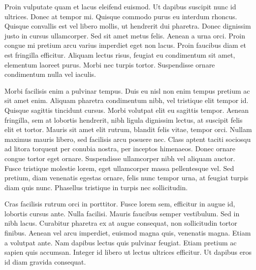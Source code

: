 Proin vulputate quam et lacus eleifend euismod. Ut dapibus suscipit nunc id ultrices. Donec at tempor mi. Quisque commodo purus eu interdum rhoncus. Quisque convallis est vel libero mollis, ut hendrerit dui pharetra. Donec dignissim justo in cursus ullamcorper. Sed sit amet metus felis. Aenean a urna orci. Proin congue mi pretium arcu varius imperdiet eget non lacus. Proin faucibus diam et est fringilla efficitur. Aliquam lectus risus, feugiat eu condimentum sit amet, elementum laoreet purus. Morbi nec turpis tortor. Suspendisse ornare condimentum nulla vel iaculis.

Morbi facilisis enim a pulvinar tempus. Duis eu nisl non enim tempus pretium ac sit amet enim. Aliquam pharetra condimentum nibh, vel tristique elit tempor id. Quisque sagittis tincidunt cursus. Morbi volutpat elit eu sagittis tempor. Aenean fringilla, sem at lobortis hendrerit, nibh ligula dignissim lectus, at suscipit felis elit et tortor. Mauris sit amet elit rutrum, blandit felis vitae, tempor orci. Nullam maximus mauris libero, sed facilisis arcu posuere nec. Class aptent taciti sociosqu ad litora torquent per conubia nostra, per inceptos himenaeos. Donec ornare congue tortor eget ornare. Suspendisse ullamcorper nibh vel aliquam auctor. Fusce tristique molestie lorem, eget ullamcorper massa pellentesque vel. Sed pretium, diam venenatis egestas ornare, felis nunc tempor urna, at feugiat turpis diam quis nunc. Phasellus tristique in turpis nec sollicitudin.

Cras facilisis rutrum orci in porttitor. Fusce lorem sem, efficitur in augue id, lobortis cursus ante. Nulla facilisi. Mauris faucibus semper vestibulum. Sed in nibh lacus. Curabitur pharetra ex at augue consequat, non sollicitudin tortor finibus. Aenean vel arcu imperdiet, euismod magna quis, venenatis magna. Etiam a volutpat ante. Nam dapibus lectus quis pulvinar feugiat. Etiam pretium ac sapien quis accumsan. Integer id libero ut lectus ultrices efficitur. Ut dapibus eros id diam gravida consequat. 